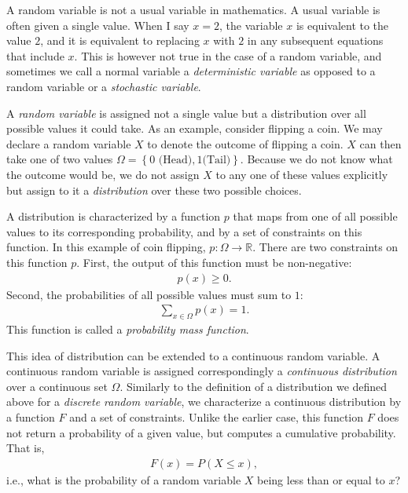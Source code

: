 \documentclass{report}
\newcommand{\RR}[0]{\mathbb{R}}
\begin{document}
A random variable is not a usual variable in mathematics. A usual variable is
often given a single value. When I say $x=2$, the variable $x$ is equivalent to
the value $2$, and it is equivalent to replacing $x$ with $2$ in any subsequent
equations that include $x$. This is however not true in the case of a random
variable, and sometimes we call a normal variable a {\it deterministic variable}
as opposed to a random variable or a {\it stochastic variable}.

A {\it random variable} is assigned not a single value but a distribution over
all possible values it could take. As an example, consider flipping a coin. We
may declare a random variable $X$ to denote the outcome of flipping a coin. $X$
can then take one of two values $\Omega = \left\{0\text{ (Head)}, 1\text{
(Tail)}\right\}$.  Because we do not know what the outcome would be, we do not
assign $X$ to any one of these values explicitly but assign to it a {\it
distribution} over these two possible choices. 

A distribution is characterized by a function $p$ that maps from one of all
possible values to its corresponding probability, and by a set of constraints on
this function. In this example of coin flipping, $p: \Omega \to \RR$. There are
two constraints on this function $p$. First, the output of this function must be
non-negative:
\begin{align*}
    p(x) \geq 0.
\end{align*}
Second, the probabilities of all possible values must sum to $1$:
\begin{align*}
    \sum_{x \in \Omega} p(x) = 1.
\end{align*}
This function is called a {\it probability mass function}. 

This idea of distribution can be extended to a continuous random variable. A
continuous random variable is assigned correspondingly a {\it continuous
distribution} over a continuous set $\Omega$. Similarly to the definition of a
distribution we defined above for a {\it discrete random variable}, we
characterize a continuous distribution by a function $F$ and a set of
constraints.  Unlike the earlier case, this function $F$ does not return a
probability of a given value, but computes a cumulative probability. That is,
\begin{align}
    \label{eq:cdf}
    F(x) = P(X \leq x),
\end{align}
i.e., what is the probability of a random variable $X$ being less than or equal
to $x$? 
\end{document}
